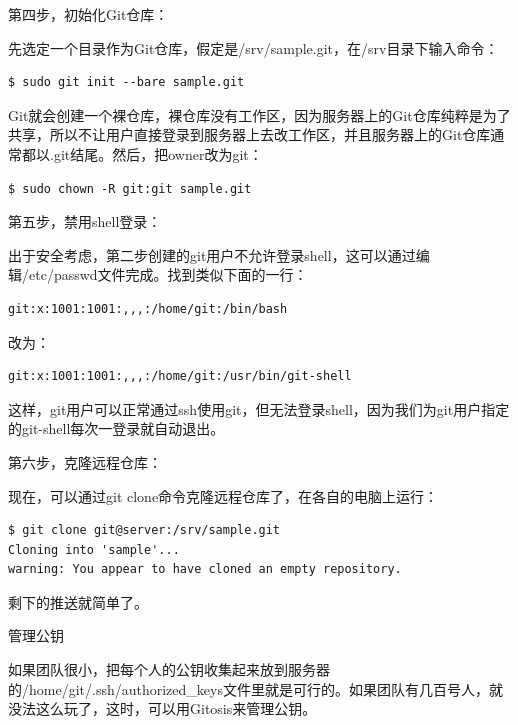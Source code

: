 第四步，初始化Git仓库：

先选定一个目录作为Git仓库，假定是/srv/sample.git，在/srv目录下输入命令：

\begin{verbatim}
$ sudo git init --bare sample.git
\end{verbatim}

Git就会创建一个裸仓库，裸仓库没有工作区，因为服务器上的Git仓库纯粹是为了共享，所以不让用户直接登录到服务器上去改工作区，并且服务器上的Git仓库通常都以.git结尾。然后，把owner改为git：

\begin{verbatim}
$ sudo chown -R git:git sample.git
\end{verbatim}

第五步，禁用shell登录：

出于安全考虑，第二步创建的git用户不允许登录shell，这可以通过编辑/etc/passwd文件完成。找到类似下面的一行：

\begin{verbatim}
git:x:1001:1001:,,,:/home/git:/bin/bash
\end{verbatim}

改为：

\begin{verbatim}
git:x:1001:1001:,,,:/home/git:/usr/bin/git-shell
\end{verbatim}

这样，git用户可以正常通过ssh使用git，但无法登录shell，因为我们为git用户指定的git-shell每次一登录就自动退出。

第六步，克隆远程仓库：

现在，可以通过git clone命令克隆远程仓库了，在各自的电脑上运行：

\begin{verbatim}
$ git clone git@server:/srv/sample.git
Cloning into 'sample'...
warning: You appear to have cloned an empty repository.
\end{verbatim}

剩下的推送就简单了。

管理公钥

如果团队很小，把每个人的公钥收集起来放到服务器的/home/git/.ssh/authorized\_keys文件里就是可行的。如果团队有几百号人，就没法这么玩了，这时，可以用Gitosis来管理公钥。

